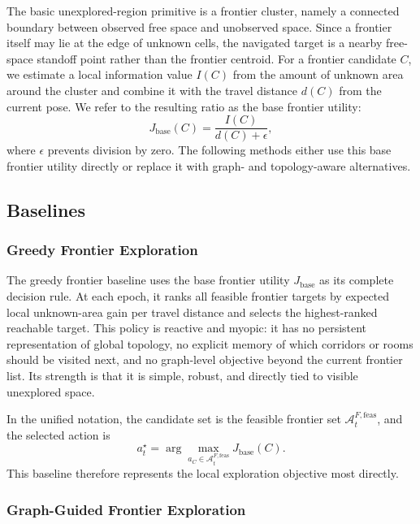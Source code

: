 \documentclass[conference]{IEEEtran}
\begin{document}
The basic unexplored-region primitive is a frontier cluster, namely a connected boundary between observed free space and unobserved space. Since a frontier itself may lie at the edge of unknown cells, the navigated target is a nearby free-space standoff point rather than the frontier centroid. For a frontier candidate $C$, we estimate a local information value $I(C)$ from the amount of unknown area around the cluster and combine it with the travel distance $d(C)$ from the current pose. We refer to the resulting ratio as the base frontier utility:
\begin{equation}
J_{\mathrm{base}}(C)=\frac{I(C)}{d(C)+\epsilon},
\end{equation}
where $\epsilon$ prevents division by zero. The following methods either use this base frontier utility directly or replace it with graph- and topology-aware alternatives.

\subsection{Baselines}

\subsubsection{Greedy Frontier Exploration}

The greedy frontier baseline uses the base frontier utility $J_{\mathrm{base}}$ as its complete decision rule. At each epoch, it ranks all feasible frontier targets by expected local unknown-area gain per travel distance and selects the highest-ranked reachable target. This policy is reactive and myopic: it has no persistent representation of global topology, no explicit memory of which corridors or rooms should be visited next, and no graph-level objective beyond the current frontier list. Its strength is that it is simple, robust, and directly tied to visible unexplored space.

In the unified notation, the candidate set is the feasible frontier set $\mathcal{A}^{F,\mathrm{feas}}_t$, and the selected action is
\begin{equation}
a_t^\star =
\arg\max_{a_C\in\mathcal{A}^{F,\mathrm{feas}}_t}
J_{\mathrm{base}}(C).
\end{equation}
This baseline therefore represents the local exploration objective most directly.

\subsubsection{Graph-Guided Frontier Exploration}
\end{document}
